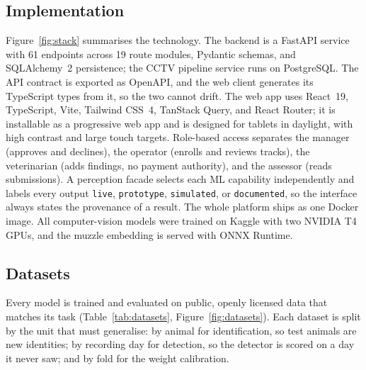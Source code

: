 \documentclass[11pt,letterpaper]{article}
\begin{document}
\subsection{Implementation}

Figure~\ref{fig:stack} summarises the technology. The backend is a FastAPI service with 61 endpoints across 19 route modules, Pydantic schemas, and SQLAlchemy~2 persistence; the CCTV pipeline service runs on PostgreSQL. The API contract is exported as OpenAPI, and the web client generates its TypeScript types from it, so the two cannot drift. The web app uses React~19, TypeScript, Vite, Tailwind CSS~4, TanStack Query, and React Router; it is installable as a progressive web app and is designed for tablets in daylight, with high contrast and large touch targets. Role-based access separates the manager (approves and declines), the operator (enrolls and reviews tracks), the veterinarian (adds findings, no payment authority), and the assessor (reads submissions). A perception facade selects each ML capability independently and labels every output \texttt{live}, \texttt{prototype}, \texttt{simulated}, or \texttt{documented}, so the interface always states the provenance of a result. The whole platform ships as one Docker image. All computer-vision models were trained on Kaggle with two NVIDIA T4 GPUs, and the muzzle embedding is served with ONNX Runtime.

\subsection{Datasets}

Every model is trained and evaluated on public, openly licensed data that matches its task (Table~\ref{tab:datasets}, Figure~\ref{fig:datasets}). Each dataset is split by the unit that must generalise: by animal for identification, so test animals are new identities; by recording day for detection, so the detector is scored on a day it never saw; and by fold for the weight calibration.
\end{document}
